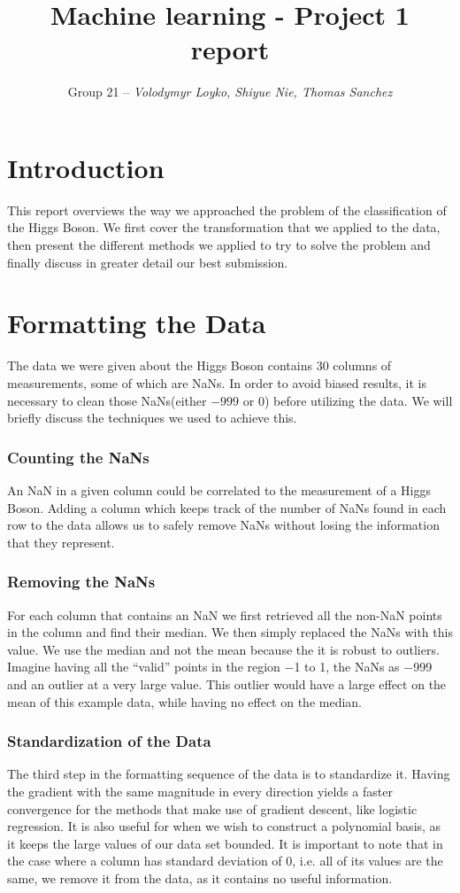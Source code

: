 \documentclass[10pt,conference,compsocconf]{IEEEtran}
\begin{document}
\title{Machine learning - Project 1 report}
\author{Group 21 -- \textit{Volodymyr Loyko, Shiyue Nie, Thomas Sanchez}}

\maketitle

\section{Introduction}
This report overviews the way we approached the problem of the classification of the Higgs Boson. We first cover the transformation that we applied to the data, then present the different methods we applied to try to solve the problem and finally discuss in greater detail our best submission.

\section{Formatting the Data}
The data we were given about the Higgs Boson contains 30 columns of measurements, some of which are NaNs. In order to avoid biased results, it is necessary to clean those NaNs(either $-999$ or $0$) before utilizing the data. We will briefly discuss the techniques we used to achieve this.

\subsubsection{Counting the NaNs}
An NaN in a given column could be correlated to the measurement of a Higgs Boson.  Adding a column which keeps track of the number of NaNs found in each row to the data allows us to safely remove NaNs without losing the information that they represent. 

\subsubsection{Removing the NaNs}
For each column that contains an NaN we first retrieved all the non-NaN points in the column and find their median. We then simply replaced the NaNs with this value. We use the median and not the mean because the it is robust to outliers. Imagine having all the “valid” points in the region −1 to 1, the NaNs as −999 and an outlier at a very large value. This outlier would have a large effect on the mean of this example data, while having no effect on the median.

\subsubsection{Standardization of the Data}
The third step in the formatting sequence of the data is to standardize it. Having the gradient with the same magnitude in every direction yields a faster convergence for the methods that make use of gradient descent, like logistic regression. It is also useful for when we wish to construct a polynomial basis, as it keeps the large values of our data set bounded. It is important to note that in the case where a column has standard deviation of 0, i.e. all of its values are the same, we remove it from the data, as it contains no useful information. 
\end{document}
